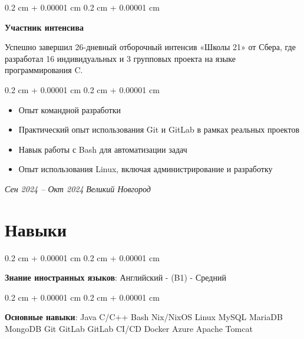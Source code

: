 \documentclass[10pt, letterpaper]{article}
\newenvironment{highlights}{
    \begin{itemize}[
        topsep=0.20 cm,
        parsep=0.20 cm,
        partopsep=0pt,
        itemsep=0pt,
        leftmargin=0.4 cm + 10pt
    ]
}{
    \end{itemize}
} %
\newenvironment{onecolentry}{
    \begin{adjustwidth}{
        0.2 cm + 0.00001 cm
    }{
        0.2 cm + 0.00001 cm
    }
}{
    \end{adjustwidth}
} %
\newenvironment{twocolentry}[2][]{
    \onecolentry
    \def\secondColumn{#2}
    \setcolumnwidth{\fill, 4.5 cm}
    \begin{paracol}{2}
}{
    \switchcolumn \raggedleft \secondColumn
    \end{paracol}
    \endonecolentry
} %
\begin{document}
    \vspace{0.5 cm}
    \begin{twocolentry}{
        \textit{Сен 2024 – Окт 2024}
        \textit{Великий Новгород}}
        
            \textbf{Участник интенсива}
                \item Успешно завершил 26-дневный отборочный интенсив «Школы 21» от Сбера, где разработал 16 индивидуальных и 3 групповых проекта на языке программирования C.

            \textit{}

        \begin{onecolentry}
            \begin{highlights}
                \item Опыт командной разработки
                \item Практический опыт использования Git и GitLab в рамках реальных проектов
                \item Навык работы с Bash для автоматизации задач
                \item Опыт использования Linux, включая администрирование и разработку

            \end{highlights}
        \end{onecolentry}
        \end{twocolentry}


    \section{Навыки}
        \begin{onecolentry}
            \textbf{Знание иностранных языков}: Английский - (B1) - Средний
        \end{onecolentry}
         \vspace{0.2 cm}
        
        \begin{onecolentry}
            \textbf{Основные навыки}:
            \colorbox{gray!15}{Java} 
            \colorbox{gray!15}{C/C++} 
            \colorbox{gray!15}{Bash}
            \colorbox{gray!15}{Nix/NixOS}
            \colorbox{gray!15}{Linux}
            \colorbox{gray!15}{MySQL}
            \colorbox{gray!15}{MariaDB}
            \colorbox{gray!15}{MongoDB}
            \colorbox{gray!15}{Git}
            \colorbox{gray!15}{GitLab}
            \colorbox{gray!15}{GitLab CI/CD}
            \colorbox{gray!15}{Docker}
            \colorbox{gray!15}{Azure}
            \colorbox{gray!15}{Apache}
            \colorbox{gray!15}{Tomcat}
        \end{onecolentry}
\end{document}
